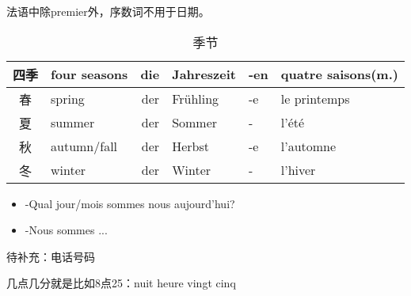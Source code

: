 \documentclass[12pt,A4paper,oneside,reqno]{amsart}
\numberwithin{equation}{section}
\theoremstyle{plain}
\theoremstyle{plain}
\theoremstyle{plain}
\numberwithin{equation}{section}
\theoremstyle{remark}
\begin{document}
法语中除premier外，序数词不用于日期。
\begin{table}[th]
	\centering
	\begin{tabular}{c|l|rll|l}
		\hline
四季	&	four seasons	&	die	&	Jahreszeit	&	-en	&	quatre saisons(m.)	\\
\hline											
春	&	spring	&	der	&	Fr\"{u}hling	&	-e	&	le printemps	\\
夏	&	summer	&	der	&	Sommer	&	-	&	l'\'{e}t\'{e}	\\
秋	&	autumn/fall	&	der	&	Herbst	&	-e	&	l'automne	\\
冬	&	winter	&	der	&	Winter	&	-	&	l'hiver	\\


		\hline
	\end{tabular}
	\vspace{0.5cm}
	\caption{季节}
\end{table}
\begin{itemize}
	\item []-Qual jour/mois sommes nous aujourd'hui? 
	\item []-Nous sommes ...
\end{itemize}

待补充：电话号码

几点几分就是比如8点25：nuit heure vingt cinq
\end{document}
